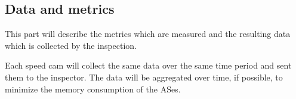 \documentclass[thesis.tex]{subfiles}
\begin{document}
%
%
%
%
%
%
%
%



\subsection{Data and metrics}
This part will describe the metrics which are measured and the resulting data which is collected by the inspection.

Each speed cam will collect the same data over the same time period and sent them to the inspector. The data will be aggregated over time, if possible, to minimize the memory consumption of the ASes.
\end{document}
